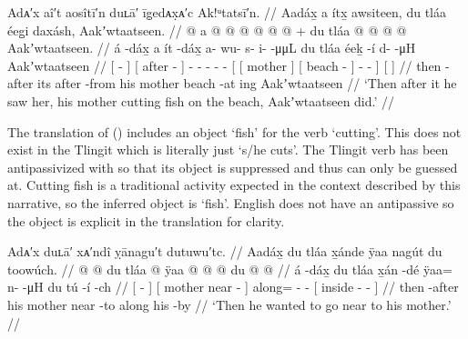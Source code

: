 \ex\label{ex:100-120-saw-his-mother}%
%
\begingl
	\glpreamble	Adᴀ′x aî′t aosîtī′n duʟā′ īg̣edᴀx̣ᴀ′c Ak!ᵘtatsī′n. //
	\glpreamble	Aadáx̱ a ítx̱ awsiteen, du tláa éeg̱i daxásh, Aakʼwtaatseen. //
	\gla	{}  @ {} {}
		{} a  @ {} {}
		 @ {} @ {} @ {} @ {} @ {} +
		{} {} du tláa {}
			{}  @ {} {}
			 @ {} @ {} @ {} {}
		{} Aakʼwtaatseen. {} //
	\glb	{} á -dáx̱ {}
		{} a ít -dáx̱ {}
		a- wu- s- i-  -μμL
		{} {} du tláa {}
			{} éeḵ -í {}
			d-  -μH {} {}
		{} Aakʼwtaatseen {} //
	\glc	{}[  - {}]
		{}[  after - {}]
		- - - -  -
		{}[ {}[  mother {}]
			{}[ beach - {}]
			-  -\hspace{1.25em} \· {}]
		{}[  {}] //
	\gld	{} then -after {}
		{} its after -from {}
		 {} {} {} {} {}
		{} {} his mother {}
			{} beach -at {}
			 {} {} \·ing {}
		{} Aakʼwtaatseen {} //
	\glft	‘Then after it he saw her, his mother cutting fish on the beach, Aakʼwtaatseen did.’
		//
\endgl
\xe

The translation of (\lastx) includes an object ‘fish’ for the verb ‘cutting’.
This does not exist in the Tlingit  which is literally just ‘s/he cuts’.
The Tlingit verb has been antipassivized with  so that its object is suppressed and thus can only be guessed at.
Cutting fish is a traditional activity expected in the context described by this narrative, so the inferred object is  ‘fish’.
English does not have an antipassive so the object is explicit in the translation for clarity.

\ex\label{ex:100-121-want-to-go-near-mom}%
%
\begingl
	\glpreamble	Adᴀ′x duʟā′ xᴀ′ndî ỵānagu′t dutuwu′tc. //
	\glpreamble	Aadáx̱ du tláa x̱ánde ÿaa nagút du toowúch. //
	\gla	{}  @ {} @ {}
		{} du tláa  @ {} {} 
		ÿaa @  @ {} @ {}
		{} du  @ {} @ {} {} //
	\glb	{} á -dáx̱ {} 
		{} du tláa x̱án -dé {} 
		ÿaa= n-  -μH
		{} du tú -í -ch {} //
	\glc	{}[  - {}]
		{}[  mother near - {}]
		along= -  -
		{}[  inside - - {}] //
	\gld	{} then -after {} 
		{} his mother near -to {} 
		along  {} {}
		{} his  {} -by {} //
	\glft	‘Then he wanted to go near to his mother.’
		//
\endgl
\xe

